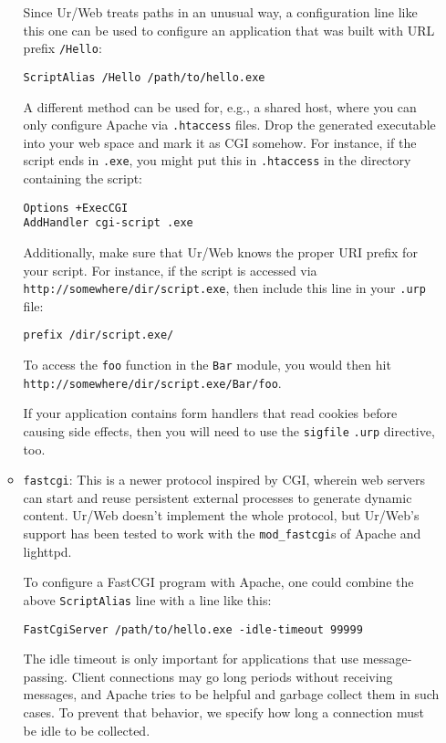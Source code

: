 \documentclass{article}
\begin{document}
\begin{itemize}
\begin{itemize}
    Since Ur/Web treats paths in an unusual way, a configuration line like this one can be used to configure an application that was built with URL prefix \texttt{/Hello}:
    \begin{verbatim}
ScriptAlias /Hello /path/to/hello.exe
    \end{verbatim}

    A different method can be used for, e.g., a shared host, where you can only configure Apache via \texttt{.htaccess} files.  Drop the generated executable into your web space and mark it as CGI somehow.  For instance, if the script ends in \texttt{.exe}, you might put this in \texttt{.htaccess} in the directory containing the script:
    \begin{verbatim}
Options +ExecCGI
AddHandler cgi-script .exe
    \end{verbatim}

    Additionally, make sure that Ur/Web knows the proper URI prefix for your script.  For instance, if the script is accessed via \texttt{http://somewhere/dir/script.exe}, then include this line in your \texttt{.urp} file:
    \begin{verbatim}
prefix /dir/script.exe/
    \end{verbatim}

    To access the \texttt{foo} function in the \texttt{Bar} module, you would then hit \texttt{http://somewhere/dir/script.exe/Bar/foo}.

    If your application contains form handlers that read cookies before causing side effects, then you will need to use the \texttt{sigfile} \texttt{.urp} directive, too.

  \item \texttt{fastcgi}: This is a newer protocol inspired by CGI, wherein web servers can start and reuse persistent external processes to generate dynamic content.  Ur/Web doesn't implement the whole protocol, but Ur/Web's support has been tested to work with the \texttt{mod\_fastcgi}s of Apache and lighttpd.

    To configure a FastCGI program with Apache, one could combine the above \texttt{ScriptAlias} line with a line like this:
    \begin{verbatim}
FastCgiServer /path/to/hello.exe -idle-timeout 99999
    \end{verbatim}
    The idle timeout is only important for applications that use message-passing.  Client connections may go long periods without receiving messages, and Apache tries to be helpful and garbage collect them in such cases.  To prevent that behavior, we specify how long a connection must be idle to be collected.


\end{itemize}
\end{itemize}
\end{document}
